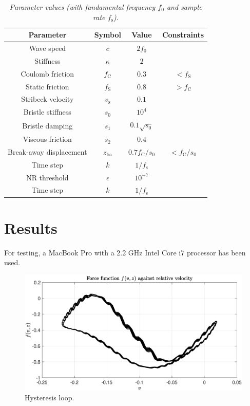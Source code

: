 \documentclass[twoside,a4paper]{article}
\begin{document}
\begin{table}[ht]
  \caption{{\it Parameter values (with fundamental frequency $f_0$ and sample rate $f_\text{s}$).}}
	\centering
  \begin{tabular}{|c|c|c|c|}\hline
    Parameter & Symbol & Value & Constraints\\ \hline
    Wave speed & $c$ & $2 f_0$ & \\
    Stiffness & $\kappa$ & $2$ & \\
    Coulomb friction & $f_\text{C}$ & $0.3$ & $<f_\text{S}$ \\
    Static friction & $f_\text{S}$ & $0.8$ & $>f_\text{C}$ \\
    Stribeck velocity & $v_\text{s}$ & $0.1$ & \\
    Bristle stiffness & $s_0$ & $10^4$ & \\
    Bristle damping & $s_1$ & $0.1\sqrt{s_0}$ & \\
    Viscous friction & $s_2$ & $0.4$ & \\
    Break-away displacement & $z_\text{ba}$ & $0.7 f_\text{C}/s_0$ & $<f_\text{C}/s_0$ \\
    Time step & $k$ & $1/f_\text{s}$ & \\
    NR threshold & $\epsilon$ & $10^{-7}$ & \\
    Time step & $k$ & $1/f_\text{s}$ & \\
    \hline
 \end{tabular}
  \label{tab:parameters}
\end{table}

\section{Results}\label{sec:results}
For testing, a MacBook Pro with a 2.2 GHz Intel Core i7 processor has been used. 
\begin{figure}[ht]
\centerline{\includegraphics[width=1.0\columnwidth]{hysteresis.eps}}
\caption{\label{fig:hysteresis}Hysteresis loop.}
\end{figure}
\end{document}

